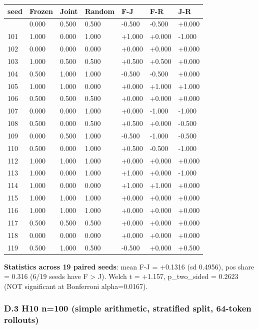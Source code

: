 \documentclass[11pt]{article}
\begin{document}
{\def\LTcaptype{none} %
\begin{longtable}[]{@{}lllllll@{}}
\toprule\noalign{}
seed & Frozen & Joint & Random & F-J & F-R & J-R \\
\midrule\noalign{}
\endhead
\bottomrule\noalign{}
\endlastfoot
100 & 0.000 & 0.500 & 0.500 & -0.500 & -0.500 & +0.000 \\
101 & 1.000 & 0.000 & 1.000 & +1.000 & +0.000 & -1.000 \\
102 & 0.000 & 0.000 & 0.000 & +0.000 & +0.000 & +0.000 \\
103 & 1.000 & 0.500 & 0.500 & +0.500 & +0.500 & +0.000 \\
104 & 0.500 & 1.000 & 1.000 & -0.500 & -0.500 & +0.000 \\
105 & 1.000 & 1.000 & 0.000 & +0.000 & +1.000 & +1.000 \\
106 & 0.500 & 0.500 & 0.500 & +0.000 & +0.000 & +0.000 \\
107 & 0.000 & 0.000 & 1.000 & +0.000 & -1.000 & -1.000 \\
108 & 0.500 & 0.000 & 0.500 & +0.500 & +0.000 & -0.500 \\
109 & 0.000 & 0.500 & 1.000 & -0.500 & -1.000 & -0.500 \\
110 & 0.500 & 0.000 & 1.000 & +0.500 & -0.500 & -1.000 \\
112 & 1.000 & 1.000 & 1.000 & +0.000 & +0.000 & +0.000 \\
113 & 1.000 & 0.000 & 1.000 & +1.000 & +0.000 & -1.000 \\
114 & 1.000 & 0.000 & 0.000 & +1.000 & +1.000 & +0.000 \\
115 & 1.000 & 1.000 & 1.000 & +0.000 & +0.000 & +0.000 \\
116 & 1.000 & 1.000 & 1.000 & +0.000 & +0.000 & +0.000 \\
117 & 0.500 & 0.500 & 0.500 & +0.000 & +0.000 & +0.000 \\
118 & 0.000 & 0.000 & 0.000 & +0.000 & +0.000 & +0.000 \\
119 & 0.500 & 1.000 & 0.500 & -0.500 & +0.000 & +0.500 \\
\end{longtable}
}

\textbf{Statistics across 19 paired seeds}: mean F-J = +0.1316 (sd
0.4956), pos share = 0.316 (6/19 seeds have F \textgreater{} J). Welch t
= +1.157, p\_two\_sided = 0.2623 (NOT significant at Bonferroni
alpha=0.0167).

\subsubsection{D.3 H10 n=100 (simple arithmetic, stratified split,
64-token
rollouts)}\label{d.3-h10-n100-simple-arithmetic-stratified-split-64-token-rollouts}
\end{document}
